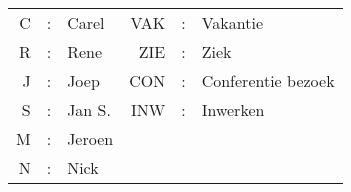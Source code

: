 {\begin{tabular}{||r||p{3em}|p{3em}|p{3em}|p{3em}|p{3em}||p{3em}|p{3em}|p{3em}|p{3em}||}
\end{tabular}
\rm
\hspace{10mm}\\ \\ 
\normalsize
\begin{tabular}{rcp{6em}rcl}
C&:&Carel             &VAK&:&Vakantie             \\
R&:&Rene              &ZIE&:&Ziek                 \\
J&:&Joep              &CON&:&Conferentie bezoek   \\ 
S&:&Jan S.            &INW&:&Inwerken             \\
M&:&Jeroen            &   & &                     \\
N&:&Nick              &   & &                     \\
\end{tabular}}
